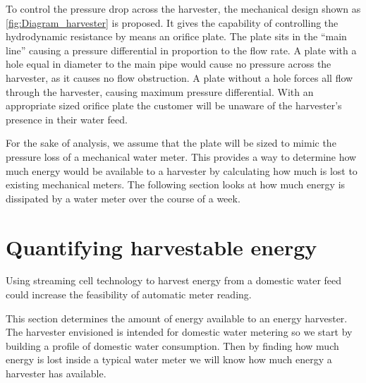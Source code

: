     To control the pressure drop across the harvester, the mechanical design shown as \cref{fig:Diagram_harvester} is proposed.
    It gives the capability of controlling the hydrodynamic resistance by means an orifice plate.
    The plate sits in the ``main line'' causing a pressure differential in proportion to the flow rate.
    A plate with a hole equal in diameter to the main pipe would cause no pressure across the harvester, as it causes no flow obstruction.
    A plate without a hole forces all flow through the harvester, causing maximum pressure differential.
    With an appropriate sized orifice plate the customer will be unaware of the harvester's presence in their water feed.
    
    For the sake of analysis, we assume that the plate will be sized to mimic the pressure loss of a mechanical water meter.
    This provides a way to determine how much energy would be available to a harvester by calculating how much is lost to existing mechanical meters.
    The following section looks at how much energy is dissipated by a water meter over the course of a week.


  \section{Quantifying harvestable energy}

    Using streaming cell technology to harvest energy from a domestic water feed could increase the feasibility of automatic meter reading.

    This section determines the amount of energy available to an energy harvester.
    The harvester envisioned is intended for domestic water metering so we start by building a profile of domestic water consumption.
    Then by finding how much energy is lost inside a typical water meter we will know how much energy a harvester has available.

